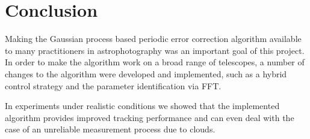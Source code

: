 \section{Conclusion}

Making the Gaussian process based periodic error correction algorithm available
to many practitioners in astrophotography was an important goal of this
project. In order to make the algorithm work on a broad range of telescopes,
a number of changes to the algorithm were developed and implemented, such as a
hybrid control strategy and the parameter identification via FFT.

In experiments under realistic conditions we showed that the implemented
algorithm provides improved tracking performance and can even deal with the
case of an unreliable measurement process due to clouds.
